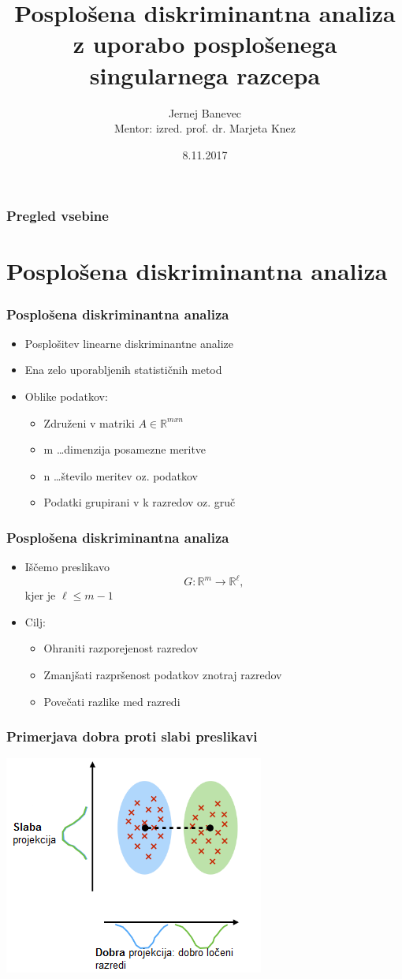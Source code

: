 \documentclass{beamer}
\title[kratka predstavitev diplomskega dela]{Posplošena diskriminantna analiza z uporabo posplošenega singularnega razcepa }
\author[Jernej Banevec]{Jernej Banevec\\
\medskip
{\small Mentor: izred. prof. dr. Marjeta Knez}
}
\institute[FMF] 
{
Fakulteta za matematiko in fiziko\\ 
\medskip
\textit{kratka predstavitev diplomskega dela} 
}
\date{8.11.2017}
\begin{document}
\begin{frame}
\titlepage
\end{frame}

\begin{frame}
\frametitle{Pregled vsebine} 
\tableofcontents 
\end{frame}


\section{Posplošena diskriminantna analiza}

\begin{frame}
\frametitle{Posplošena diskriminantna analiza}
\begin{itemize}
\item Posplošitev linearne diskriminantne analize
\item Ena zelo uporabljenih statističnih metod
\item Oblike podatkov:
\begin{itemize}
\item Združeni v matriki $A \in \mathbb{R}^{mxn}$
\item m \ldots dimenzija posamezne meritve
\item n \ldots število meritev oz. podatkov
\item Podatki grupirani v k razredov oz. gruč
\end{itemize}
\end{itemize}
\end{frame}


\begin{frame}
\frametitle{Posplošena diskriminantna analiza}
\begin{itemize}
\item Iščemo preslikavo $$G : \mathbb{R}^m \rightarrow \mathbb{R}^\ell ,$$ kjer je $\ell \leqslant m - 1$
\item Cilj:
\begin{itemize}
\item Ohraniti razporejenost razredov
\item Zmanjšati razpršenost podatkov znotraj razredov
\item Povečati razlike med razredi
\end{itemize}
\end{itemize}
\end{frame}


\begin{frame}
\frametitle{Primerjava dobra proti slabi preslikavi}
\includegraphics[scale = 0.85]{dobra-slaba}
\end{frame}
\end{document}
